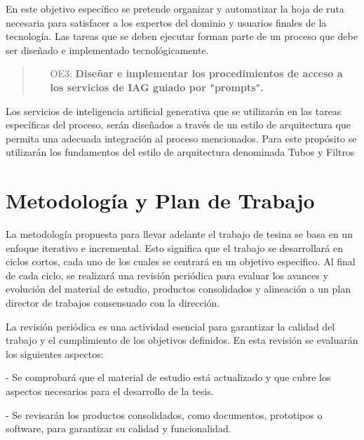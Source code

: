 \documentclass[12pt]{article}
\begin{document}
        En este objetivo específico se pretende organizar y automatizar la hoja de ruta necesaria para satisfacer a los expertos del dominio y usuarios finales de la tecnología. Las tareas que se deben ejecutar forman parte de un proceso que debe ser diseñado e implementado tecnológicamente.

        
        \vspace{0.3 cm}

        \begin{quote}
            \begin{itemize}
                    \item [OE3:] \textbf{Diseñar e implementar los procedimientos de acceso a los servicios de IAG guiado por "prompts".}
            \end{itemize}
        \end{quote}

        \vspace{0.3 cm}

        Los servicios de inteligencia artificial generativa que se utilizarán en las tareas específicas del proceso, serán diseñados a través de un estilo de arquitectura que permita una adecuada integración al proceso mencionados. Para este propósito se utilizarán los fundamentos del estilo de arquitectura denominada Tubos y Filtros \cite{land2002brief}
        

\section{Metodología y Plan de Trabajo}

La metodología propuesta para llevar adelante el trabajo de tesina se basa en un enfoque iterativo e incremental. Esto significa que el trabajo se desarrollará en ciclos cortos, cada uno de los cuales se centrará en un objetivo específico. Al final de cada ciclo, se realizará una revisión periódica para evaluar los avances y evolución del material de estudio, productos consolidados y alineación a un plan director de trabajos consensuado con la dirección.

La revisión periódica es una actividad esencial para garantizar la calidad del trabajo y el cumplimiento de los objetivos definidos. En esta revisión se evaluarán los siguientes aspectos:

- Se comprobará que el material de estudio está actualizado y que cubre los aspectos necesarios para el desarrollo de la tesis.

- Se revisarán los productos consolidados, como documentos, prototipos o software, para garantizar su calidad y funcionalidad.
\end{document}
